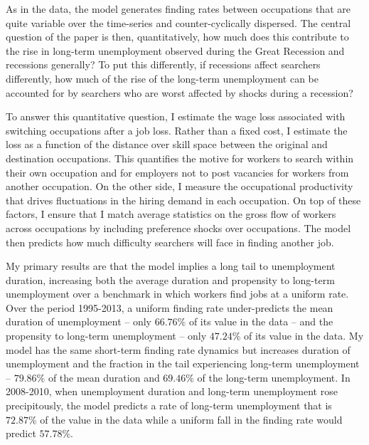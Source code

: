 \documentclass[12pt]{article}
\newcommand{\highlightP}[1]{{\emph{\color{MyPink}{#1}}}}
\newcommand{\highlightO}[1]{{\emph{\color{MyOrange}{#1}}}}
\theoremstyle{definition}
\begin{document}
As in the data, the model generates finding rates between occupations that are quite variable over the time-series and counter-cyclically dispersed. \highlightO{I target these cyclical properties with a parametrization of the stochastic process such that occupations differ in their cyclical sensitivity.} \highlightP{Hence, some occupations fare better than others in a recession and so those attached to the wrong occupation will suffer longer unemployment spells compared to searchers skilled in other occupations. This makes the tail of the distribution of unemployment duration extend by even more than would be implied by the fall in the average finding rate.} The central question of the paper is then, quantitatively, how much does this contribute to the rise in long-term unemployment observed during the Great Recession and recessions generally? To put this differently, if recessions affect searchers differently, how much of the rise of the long-term unemployment can be accounted for by searchers who are worst affected by shocks during a recession?

To answer this quantitative question, I estimate the wage loss associated with switching occupations after a job loss. Rather than a fixed cost, I estimate the loss as a function of the distance over skill space between the original and destination occupations. This quantifies the motive for workers to search within their own occupation and for employers not to post vacancies for workers from another occupation. On the other side, I measure the occupational productivity that drives fluctuations in the hiring demand in each occupation. On top of these factors, I ensure that I match average statistics on the gross flow of workers across occupations by including preference shocks over occupations. The model then predicts how much difficulty searchers will face in finding another job.

My primary results are that the model implies a long tail to unemployment duration, increasing both the average duration and propensity to long-term unemployment over a benchmark in which workers find jobs at a uniform rate. Over the period 1995-2013, a uniform finding rate under-predicts the mean duration of unemployment -- only $66.76\%$ of its value in the data -- and the propensity to long-term unemployment -- only $47.24\%$ of its value in the data. My model has the same short-term finding rate dynamics but increases duration of unemployment and the fraction in the tail experiencing long-term unemployment -- $79.86\%$ of the mean duration and $69.46\%$ of the long-term unemployment. In 2008-2010, when unemployment duration and long-term unemployment rose precipitously, the model predicts a rate of long-term unemployment that is $72.87\%$ of the value in the data while a uniform fall in the finding rate would predict $57.78\%$.
\end{document}
